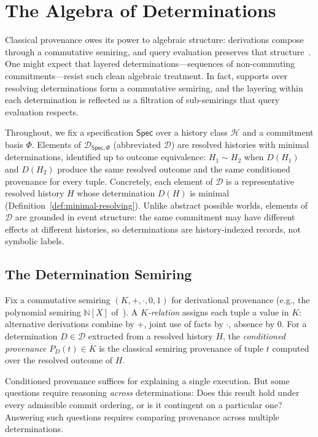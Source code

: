 \documentclass[acmsmall,review,anonymous]{acmart}
\newcommand{\Hist}{\mathcal{H}}
\newcommand{\Spec}{\mathsf{Spec}}
\theoremstyle{remark}
\numberwithin{definition}{section}
\numberwithin{theorem}{section}
\numberwithin{lemma}{section}
\numberwithin{corollary}{section}
\numberwithin{remark}{section}
\numberwithin{example}{section}
\numberwithin{observation}{section}
\numberwithin{assumption}{section}
\begin{document}
\section{The Algebra of Determinations}
\label{sec:conditional-semiring}

Classical provenance owes its power to algebraic structure: derivations
compose through a commutative semiring, and query evaluation preserves
that structure~\cite{green2007provenance}.
One might expect that layered determinations---sequences of non-commuting
commitments---resist such clean algebraic treatment.
In fact, supports over resolving determinations form a commutative
semiring, and the layering within each determination is reflected as a
filtration of sub-semirings that query evaluation respects.

Throughout, we fix a specification $\Spec$ over a history class $\Hist$ and
a commitment basis $\Phi$.
Elements of $\mathcal{D}_{\Spec,\Phi}$ (abbreviated $\mathcal{D}$) are
resolved histories with minimal determinations, identified up to
outcome equivalence: $H_1 \sim H_2$ when $D(H_1)$ and $D(H_2)$ produce
the same resolved outcome and the same conditioned provenance for every
tuple.
Concretely, each element of $\mathcal{D}$ is a representative resolved
history $H$ whose determination $D(H)$ is minimal
(Definition~\ref{def:minimal-resolving}).
Unlike abstract possible worlds, elements of $\mathcal{D}$ are
grounded in event structure: the same commitment may have different
effects at different histories, so determinations are history-indexed
records, not symbolic labels.

\subsection{The Determination Semiring}
\label{sec:det-semiring}
\label{sec:algebra}

Fix a commutative semiring $(K, +, \cdot, 0, 1)$ for derivational provenance
(e.g., the polynomial semiring $\mathbb{N}[X]$ of~\cite{green2007provenance}).
A \emph{$K$-relation} assigns each tuple a value in $K$: alternative
derivations combine by $+$, joint use of facts by $\cdot$, absence by $0$.
For a determination $D \in \mathcal{D}$ extracted from a resolved
history $H$, the \emph{conditioned provenance} $P_D(t) \in K$ is the
classical semiring provenance of tuple $t$ computed over the resolved
outcome of $H$.

Conditioned provenance suffices for explaining a single execution.
But some questions require reasoning \emph{across} determinations:
Does this result hold under every admissible commit ordering, or is it
contingent on a particular one?
Answering such questions requires comparing provenance across multiple
determinations.
\end{document}
